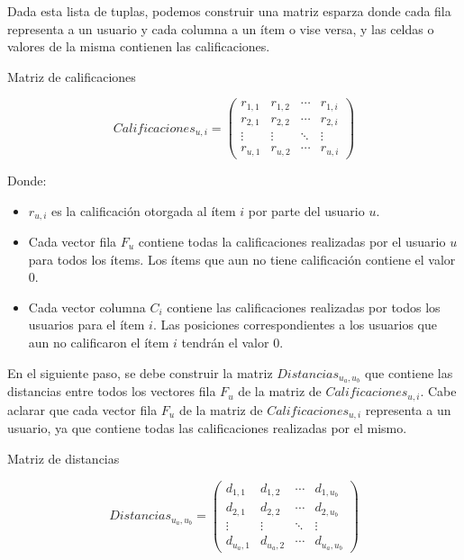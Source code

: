 \documentclass[11pt,a4paper,twoside]{thesis}
\begin{document}
Dada esta lista de tuplas, podemos construir una matriz esparza donde cada fila
representa a un usuario y cada columna a un ítem o vise versa, y las celdas o
valores de la misma contienen las calificaciones.

\begin{description}
	\item[Matriz de calificaciones]
\end{description}
\begin{equation}
	Calificaciones_{u,i} =
	\begin{pmatrix}
		r_{1,1} & r_{1,2} & \cdots & r_{1,i} \\
		r_{2,1} & r_{2,2} & \cdots & r_{2,i} \\
		\vdots  & \vdots  & \ddots & \vdots  \\
		r_{u,1} & r_{u,2} & \cdots & r_{u,i}
	\end{pmatrix}
\end{equation}

\begin{description}
	\item[Donde:]
\end{description}
\begin{itemize}
	\item $r_{u,i}$ es la calificación otorgada al ítem $i$ por parte del usuario $u$.
	\item Cada vector fila $F_u$ contiene todas la calificaciones realizadas por el
	      usuario $u$ para todos los ítems. Los ítems que aun no tiene calificación
	      contiene el valor $0$.
	\item Cada vector columna $C_i$ contiene las calificaciones realizadas por todos los
	      usuarios para el ítem $i$. Las posiciones correspondientes a los usuarios que
	      aun no calificaron el ítem $i$ tendrán el valor $0$.
\end{itemize}

En el siguiente paso, se debe construir la matriz $Distancias_{u_a,u_b}$ que
contiene las distancias entre todos los vectores fila $F_u$ de la matriz de
$Calificaciones_{u,i}$. Cabe aclarar que cada vector fila $F_u$ de la matriz de
$Calificaciones_{u,i}$ representa a un usuario, ya que contiene todas las
calificaciones realizadas por el mismo.

\clearpage
\begin{description}
	\item[Matriz de distancias]
\end{description}
\begin{equation}
	Distancias_{u_a,u_b} =
	\begin{pmatrix}
		d_{1,1}   & d_{1,2}   & \cdots & d_{1,u_b}   \\
		d_{2,1}   & d_{2,2}   & \cdots & d_{2,u_b}   \\
		\vdots    & \vdots    & \ddots & \vdots      \\
		d_{u_a,1} & d_{u_a,2} & \cdots & d_{u_a,u_b}
	\end{pmatrix}
\end{equation}
\end{document}
